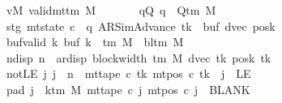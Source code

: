 \begin{isabellebody}
\ \ \ \ \ \ \ vM{\isacharcolon}{\kern0pt}\ {\isachardoublequoteopen}valid{\isacharunderscore}{\kern0pt}mttm\ M{\isachardoublequoteclose}\isanewline
\ \ \ \ \ \ \ qQ{\isacharcolon}{\kern0pt}\ {\isachardoublequoteopen}q\ {\isasymin}\ Q{\isacharunderscore}{\kern0pt}tm\ M{\isachardoublequoteclose}\isanewline
\ \ \ \ \ \ \ stg{\isacharcolon}{\kern0pt}\ {\isachardoublequoteopen}mt{\isacharunderscore}{\kern0pt}state\ c{}\ {\isacharequal}{\kern0pt}\ {\isacharparenleft}{\kern0pt}q{\isacharcomma}{\kern0pt}\ AR{\isacharunderscore}{\kern0pt}SimAdvance{\isacharcomma}{\kern0pt}\ tk{\isacharcomma}{\kern0pt}\ {}{\isacharcomma}{\kern0pt}\ buf{\isacharcomma}{\kern0pt}\ dvec{\isacharcomma}{\kern0pt}\ posk{\isacharparenright}{\kern0pt}{\isachardoublequoteclose}\isanewline
\ \ \ \ \ \ \ buf{\isacharunderscore}{\kern0pt}valid{\isacharcolon}{\kern0pt}\ {\isachardoublequoteopen}{\isasymforall}k{\isachardot}{\kern0pt}\ buf\ k\ {\isasymin}\ {\isasymGamma}{\isacharunderscore}{\kern0pt}tm\ M\ {\isasymunion}\ {\isacharbraceleft}{\kern0pt}bl{\isacharunderscore}{\kern0pt}tm\ M{\isacharbraceright}{\kern0pt}{\isachardoublequoteclose}\isanewline
\ \ \ \ \ \ \ ndisp{\isacharcolon}{\kern0pt}\ {\isachardoublequoteopen}n\ {\isacharless}{\kern0pt}\ ar{\isacharunderscore}{\kern0pt}disp\ {\isacharparenleft}{\kern0pt}block{\isacharunderscore}{\kern0pt}width\ {\isacharparenleft}{\kern0pt}{\isasymGamma}{\isacharunderscore}{\kern0pt}tm\ M{\isacharparenright}{\kern0pt}{\isacharparenright}{\kern0pt}\ {\isacharparenleft}{\kern0pt}dvec\ tk{\isacharparenright}{\kern0pt}\ {\isacharparenleft}{\kern0pt}posk\ tk{\isacharparenright}{\kern0pt}{\isachardoublequoteclose}\isanewline
\ \ \ \ \ \ \ notLE{\isacharcolon}{\kern0pt}\ {\isachardoublequoteopen}{\isasymAnd}j{\isachardot}{\kern0pt}\ j\ {\isacharless}{\kern0pt}\ n\ {\isasymLongrightarrow}\ mt{\isacharunderscore}{\kern0pt}tape\ c{}\ tk\ {\isacharparenleft}{\kern0pt}mt{\isacharunderscore}{\kern0pt}pos\ c{}\ tk\ {\isacharminus}{\kern0pt}\ j{\isacharparenright}{\kern0pt}\ {\isasymnoteq}\ LE{}{\isachardoublequoteclose}\isanewline
\ \ \ \ \ \ \ pad{}{\isacharcolon}{\kern0pt}\ {\isachardoublequoteopen}{\isasymforall}j\ {\isasymge}\ k{\isacharunderscore}{\kern0pt}tm\ M{\isachardot}{\kern0pt}\ mt{\isacharunderscore}{\kern0pt}tape\ c{}\ j\ {\isacharparenleft}{\kern0pt}mt{\isacharunderscore}{\kern0pt}pos\ c{}\ j{\isacharparenright}{\kern0pt}\ {\isacharequal}{\kern0pt}\ BLANK{}{\isachardoublequoteclose}\isanewline

\end{isabellebody}
